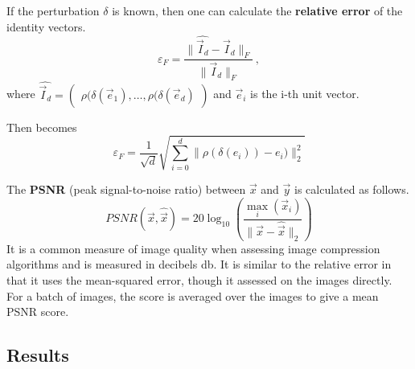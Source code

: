 If the perturbation $\delta$ is known, then one can calculate the \textbf{relative error} of the identity vectors. 
\begin{equation}
\label{eqn:relerror}
    \varepsilon_F = \frac {\|\widehat {\vec I_d} - \vec I_d\|_F} {\|\vec I_d\|_F} \,,
\end{equation}
where $\widehat {\vec I_d} = \begin{pmatrix} \rho (\delta (\vec e_1), \dots, \rho (\delta (\vec e_d) \end{pmatrix}$ and $\vec e_i$ is the i-th unit vector.

Then  becomes
\[
    \varepsilon_F = \frac 1 {\sqrt d} \sqrt{ \sum_{i=0}^d \|\rho (\delta (e_i)) - e_i)\|_2^2}
\]

The \textbf{PSNR} (peak signal-to-noise ratio) between $\vec x$ and $\vec y$ is calculated as follows.
\[
    PSNR(\vec x, \hat {\vec x}) = 20 \log_{10} \left (\frac {\max_i(\vec x_i)} {\|\vec x-\hat {\vec x}\|_2} \right )
\]
It is a common measure of image quality when assessing image compression algorithms and is measured in decibels db.
It is similar to the relative error in that it uses the mean-squared error, though it assessed on the images directly.
For a batch of images, the score is averaged over the images to give a mean PSNR score.

\subsection{Results}






